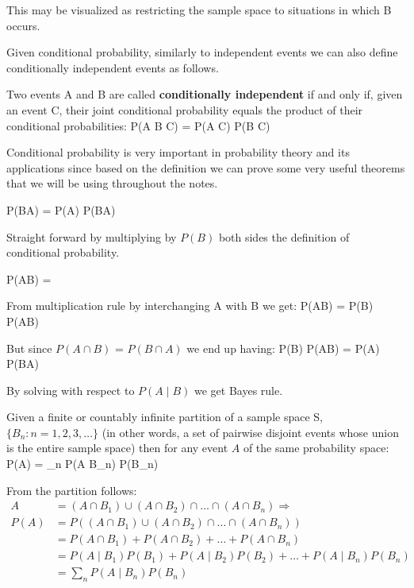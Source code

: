 This may be visualized as restricting the sample space to situations in which B occurs.

\vspace{-10pt}


\vspace{-15pt}

Given conditional probability, similarly to independent events we can also define conditionally independent events as
follows.

Two events A and B are called \textbf{conditionally independent} if and only if, given an event C, their joint
conditional probability equals the product of their conditional probabilities:
\bse
P(A \cap B \mid C) = P(A \mid C) P(B \mid C)
\ese
\ed

Conditional probability is very important in probability theory and its applications since based on the definition we
can prove some very useful theorems that we will be using throughout the notes.

\bse
P(B\cap A) = P(A) P(B\mid A)
\ese
\et

\bq
Straight forward by multiplying by $P(B)$ both sides the definition of conditional probability.
\eq

\bse
P(A\mid B) = 
\ese
\et

\bq
From multiplication rule by interchanging A with B we get:
\bse
P(A\cap B) = P(B) P(A\mid B)
\ese

But since $P(A\cap B)$ = $P(B\cap A)$ we end up having:
\bse
P(B) P(A\mid B) = P(A) P(B\mid A)
\ese

By solving with respect to $ P(A\mid B)$ we get Bayes rule.
\eq

Given a finite or countably infinite partition of a sample space S, $\{B_{n}:n=1,2,3,\ldots\}$ (in other words, a set
of pairwise disjoint events whose union is the entire sample space) then for any event $A$ of the same probability
space:
\bse
P(A) = \sum_{n} P(A \mid B_{n}) P(B_{n})
\ese
\et


\bq
From the partition follows:
{\setlength{\jot}{10pt}
\begin{align*}
A &= (A \cap B_{1}) \cup (A \cap B_{2}) \cap \ldots \cap (A \cap B_{n}) \Rightarrow \\
P(A) &= P((A \cap B_{1}) \cup (A \cap B_{2}) \cap \ldots \cap (A \cap B_{n}))\\
&= P(A \cap B_{1}) + P(A \cap B_{2}) + \ldots + P(A \cap B_{n}) \\
&= P(A \mid B_{1}) P(B_{1}) + P(A \mid B_{2}) P(B_{2}) + \ldots + P(A \mid B_{n}) P(B_{n}) \\
&= \sum_{n} P(A \mid B_{n}) P(B_{n})
\end{align*}}
\eq